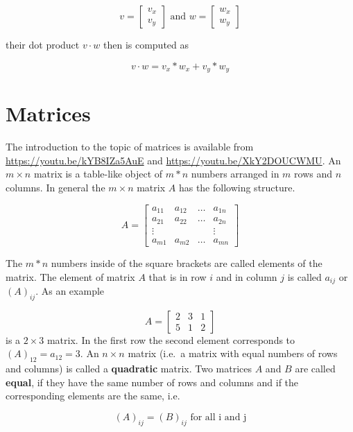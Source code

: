 \documentclass[
]{book}
\theoremstyle{definition}
\theoremstyle{definition}
\theoremstyle{definition}
\theoremstyle{remark}
\begin{document}
\[v = \left[\begin{array}{c} v_x \\ v_y \end{array}\right] \text{ and } w= \left[\begin{array}{c} w_x \\ w_y \end{array}\right]\]

their dot product \(v \cdot w\) then is computed as

\[v \cdot w = v_x * w_x + v_y * w_y\]

\hypertarget{intro-linalg-matrices}{%
\section{Matrices}\label{intro-linalg-matrices}}

The introduction to the topic of matrices is available from \url{https://youtu.be/kYB8IZa5AuE} and \url{https://youtu.be/XkY2DOUCWMU}. An \(m \times n\) matrix is a table-like object of \(m*n\) numbers arranged in \(m\) rows and \(n\) columns. In general the \(m \times n\) matrix \(A\) has the following structure.

\[
A = \left[
\begin{array}{cccc}
a_{11}  &  a_{12} &  \ldots  &  a_{1n} \\
a_{21}  &  a_{22} &  \ldots  &  a_{2n} \\
\vdots  &         &          &  \vdots \\
a_{m1}  &  a_{m2} &  \ldots  &  a_{mn}
\end{array}
\right]
\]

The \(m*n\) numbers inside of the square brackets are called elements of the matrix. The element of matrix \(A\) that is in row \(i\) and in column \(j\) is called \(a_{ij}\) or \((A)_{ij}\). As an example

\[
A =  \left[
\begin{array}{ccc}
2  &  3  &  1  \\
5  &  1  &  2
\end{array}
\right]
\]
is a \(2 \times 3\) matrix. In the first row the second element corresponds to \((A)_{12} = a_{12} = 3\). An \(n\times n\) matrix (i.e.~a matrix with equal numbers of rows and columns) is called a \textbf{quadratic} matrix. Two matrices \(A\) and \(B\) are called \textbf{equal}, if they have the same number of rows and columns and if the corresponding elements are the same, i.e.

\[
(A)_{ij} = (B)_{ij} \text{ for all i and j}
\]
\end{document}
